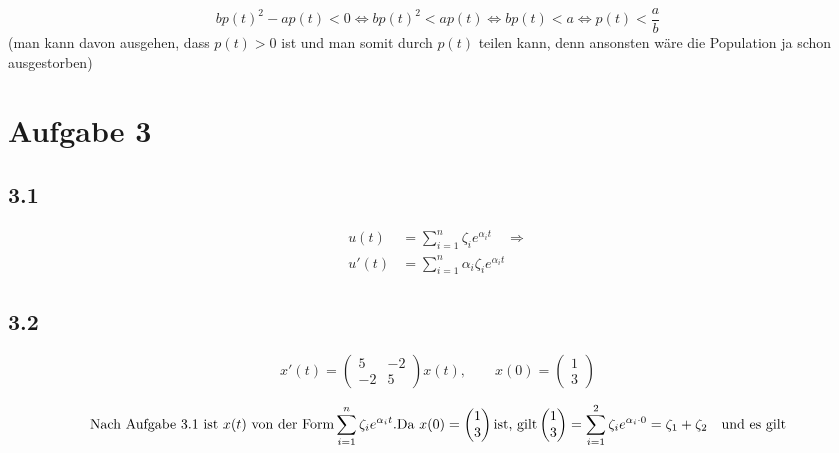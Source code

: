 \documentclass[10pt,oneside,a4paper]{scrartcl}
\begin{document}
		\begin{equation*}
			bp(t)^2- ap(t) < 0 \Leftrightarrow bp(t)^2 <  ap(t) \Leftrightarrow bp(t) < a \Leftrightarrow p(t) < \frac{a}{b}
		\end{equation*}
	(man kann davon ausgehen, dass $p(t) > 0$ ist und man somit durch $p(t)$ teilen kann, denn ansonsten wäre die Population ja schon ausgestorben)
		

	\section*{Aufgabe 3}

	\subsection*{3.1}

	\begin{align*}
		u(t) & = \sum\limits_{i=1}^{n} \zeta_{i}e^{\alpha_{i}t} \quad  \Rightarrow \\
		u'(t) & =  \sum\limits_{i=1}^{n} \alpha_{i}\zeta_{i}e^{\alpha_{i}t}
	\end{align*}


	\subsection*{3.2}

	\begin{equation*}
		x'(t) = \begin{pmatrix}
				5 & -2 \\
				-2 & 5 
			\end{pmatrix} x(t), \qquad x(0) = \begin{pmatrix}
										1 \\
										3 
									\end{pmatrix} 
	\end{equation*}

	\begin{equation*}
		\text {Nach Aufgabe 3.1 ist}\ x(t)\  \text {von der Form}  \sum\limits_{i=1}^{n} \zeta_{i}e^{\alpha_{i}t}.\\
		\text {Da}\ x(0)  =\begin{pmatrix}
						1 \\
						3 
					\end{pmatrix} \text {ist, gilt} 
					\begin{pmatrix}
						1 \\
						3 
					\end{pmatrix} =  \sum\limits_{i=1}^{2} \zeta_{i}e^{\alpha_{i}\cdot0} = \zeta_1 + \zeta_2 \quad \text{und es gilt}
	\end{equation*}
\end{document}

